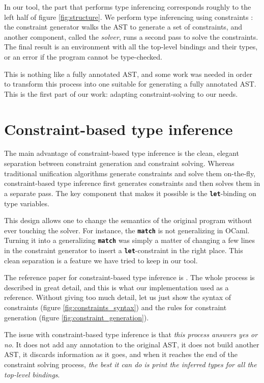 \documentclass[10pt,a4paper,twoside,titlepage,twocolumn]{article}
\newcommand{\code}[1]{\textbf{\texttt{#1}}}
\begin{document}
In our tool, the part that performs type inferencing corresponds roughly to the
left half of figure \ref{fig:structure}. We perform type inferencing using
constraints \cite{pottier2005essence}: the constraint generator walks the AST to
generate a set of constraints, and another component, called the \emph{solver},
runs a second pass to solve the constraints. The final result is an environment
with all the top-level bindings and their types, or an error if the program
cannot be type-checked.

This is nothing like a fully annotated AST, and some work was needed in order to
transform this process into one suitable for generating a fully annotated AST.
This is the first part of our work: adapting constraint-solving to our needs.

\section{Constraint-based type inference}

The main advantage of constraint-based type inference is the clean, elegant
separation between constraint generation and constraint solving. Whereas
traditional unification algorithms generate constraints and solve them
on-the-fly, constraint-based type inference first generates constraints and then
solves them in a separate pass. The key component that makes it possible is the
\code{let}-binding on type variables.

This design allows one to change the semantics of the original program without
ever touching the solver. For instance, the \code{match} is not generalizing in
OCaml. Turning it into a generalizing \code{match} was simply a matter of
changing a few lines in the constraint generator to insert a
\code{let}-constraint in the right place. This clean separation is a feature we
have tried to keep in our tool.

The reference paper for constraint-based type inference is
\cite{pottier2005essence}. The whole process is described in great detail, and
this is what our implementation used as a reference. Without giving too much
detail, let us just show the syntax of constraints (figure
\vref{fig:constraints_syntax}) and the rules for constraint generation (figure
\vref{fig:constraint_generation}).

The issue with constraint-based type inference is that \emph{this process
answers yes or no}. It does not add any annotation to the original AST, it does
not build another AST, it discards information as it goes, and when it reaches
the end of the constraint solving process, \emph{the best it can do is print the
inferred types for all the top-level bindings}.
\end{document}
